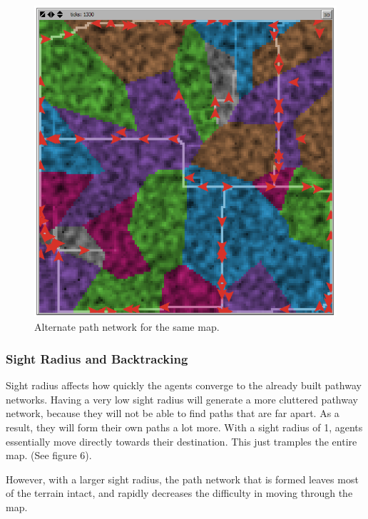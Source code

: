 \documentclass[conference]{IEEEtran}
\begin{document}
\begin{figure}[h]
\begin{center}
\includegraphics[scale=0.4]{image/results5}
\end{center}
\caption{Alternate path network for the same map.}
\end{figure}

\subsubsection{Sight Radius and Backtracking}
Sight radius affects how quickly the agents converge to the already built pathway networks. Having a very low sight radius will generate a more cluttered pathway network, because they will not be able to find paths that are far apart. As a result, they will form their own paths a lot more. With a sight radius of 1, agents essentially move directly towards their destination. This just tramples the entire map. (See figure 6).

However, with a larger sight radius, the path network that is formed leaves most of the terrain intact, and rapidly decreases the difficulty in moving through the map.
\end{document}
